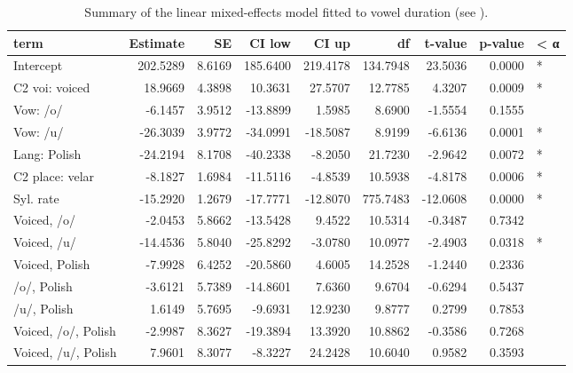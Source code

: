 \documentclass[preprint]{JASAnew}
\begin{document}
\begin{table}

\caption{\label{tab:vow-table}Summary of the linear mixed-effects model fitted to vowel duration (see ).}
\centering
\begin{tabular}[t]{lrrrrrrrl}
\toprule
term & Estimate & SE & CI low & CI up & df & t-value & p-value & < α\\
\midrule
Intercept & 202.5289 & 8.6169 & 185.6400 & 219.4178 & 134.7948 & 23.5036 & 0.0000 & *\\
C2 voi: voiced & 18.9669 & 4.3898 & 10.3631 & 27.5707 & 12.7785 & 4.3207 & 0.0009 & *\\
Vow: /o/ & -6.1457 & 3.9512 & -13.8899 & 1.5985 & 8.6900 & -1.5554 & 0.1555 & \\
Vow: /u/ & -26.3039 & 3.9772 & -34.0991 & -18.5087 & 8.9199 & -6.6136 & 0.0001 & *\\
Lang: Polish & -24.2194 & 8.1708 & -40.2338 & -8.2050 & 21.7230 & -2.9642 & 0.0072 & *\\
\addlinespace
C2 place: velar & -8.1827 & 1.6984 & -11.5116 & -4.8539 & 10.5938 & -4.8178 & 0.0006 & *\\
Syl. rate & -15.2920 & 1.2679 & -17.7771 & -12.8070 & 775.7483 & -12.0608 & 0.0000 & *\\
Voiced, /o/ & -2.0453 & 5.8662 & -13.5428 & 9.4522 & 10.5314 & -0.3487 & 0.7342 & \\
Voiced, /u/ & -14.4536 & 5.8040 & -25.8292 & -3.0780 & 10.0977 & -2.4903 & 0.0318 & *\\
Voiced, Polish & -7.9928 & 6.4252 & -20.5860 & 4.6005 & 14.2528 & -1.2440 & 0.2336 & \\
\addlinespace
/o/, Polish & -3.6121 & 5.7389 & -14.8601 & 7.6360 & 9.6704 & -0.6294 & 0.5437 & \\
/u/, Polish & 1.6149 & 5.7695 & -9.6931 & 12.9230 & 9.8777 & 0.2799 & 0.7853 & \\
Voiced, /o/, Polish & -2.9987 & 8.3627 & -19.3894 & 13.3920 & 10.8862 & -0.3586 & 0.7268 & \\
Voiced, /u/, Polish & 7.9601 & 8.3077 & -8.3227 & 24.2428 & 10.6040 & 0.9582 & 0.3593 & \\
\bottomrule
\end{tabular}
\end{table}
\end{document}
